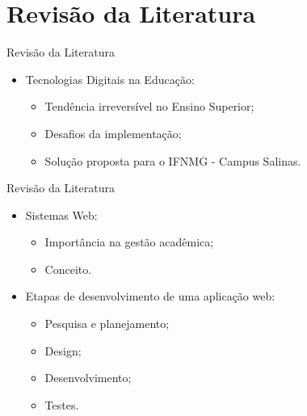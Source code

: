 \section{Revisão da Literatura}

\begin{frame}{Revisão da Literatura}
    \begin{itemize}
        \item Tecnologias Digitais na Educação: \vspace{0.5cm}
              \begin{itemize}
                  \item Tendência irreversível no Ensino Superior; \vspace{0.5cm}
                  \item Desafios da implementação; \vspace{0.5cm}
                  \item Solução proposta para o IFNMG - Campus Salinas. \vspace{0.5cm}
              \end{itemize}
    \end{itemize}
\end{frame}

\begin{frame}{Revisão da Literatura}
    \begin{itemize}
        \item Sistemas Web: \vspace{0.25cm}
              \begin{itemize}
                  \item Importância na gestão acadêmica; \vspace{0.25cm}
                  \item Conceito. \vspace{0.25cm}
              \end{itemize}
        \item Etapas de desenvolvimento de uma aplicação web: \vspace{0.25cm}
              \begin{itemize}
                  \item Pesquisa e planejamento; \vspace{0.25cm}
                  \item Design; \vspace{0.25cm}
                  \item Desenvolvimento; \vspace{0.25cm}
                  \item Testes. \vspace{0.25cm}
              \end{itemize}
    \end{itemize}
\end{frame}


